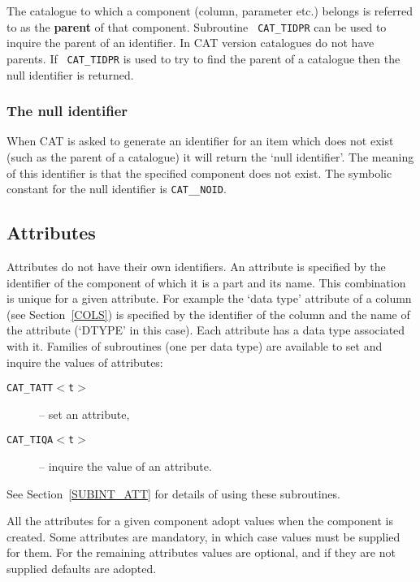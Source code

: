 The catalogue to which a component (column, parameter etc.) belongs is 
referred to as the {\bf parent} of that component. Subroutine {\tt
CAT\_TIDPR} can be used to inquire the parent of an identifier. In
CAT version \CATversion catalogues do not have parents. If {\tt 
CAT\_TIDPR} is used to try to find the parent of a catalogue then the 
null identifier is returned.

\subsubsection{The null identifier}

When CAT is asked to generate an identifier for an item which does not
exist (such as the parent of a catalogue) it will return the `null
identifier'. The meaning of this identifier is that the specified
component does not exist. The symbolic constant for the null identifier
is {\tt CAT\_\_NOID}.


\subsection{Attributes}

Attributes do not have their own identifiers. An attribute is 
specified by the identifier of the component of which it is a part and
its name. This combination is unique for a given attribute. For example
the `data type' attribute of a column (see Section~\ref{COLS}) is
specified by the identifier of the column and the name of the attribute
(`DTYPE' in this case). Each attribute has a data type associated with 
it. Families of subroutines (one per data type) are available to set 
and inquire the values of attributes:

\begin{description}

  \item[{\tt CAT\_TATT$<$t$>$}] -- set an attribute,

  \item[{\tt CAT\_TIQA$<$t$>$} ] -- inquire the value of an attribute.

\end{description}

See Section~\ref{SUBINT_ATT} for details of using these subroutines.

All the attributes for a given component adopt values when the component
is created. Some attributes are mandatory, in which case values must
be supplied for them. For the remaining attributes values are optional,
and if they are not supplied defaults are adopted.

